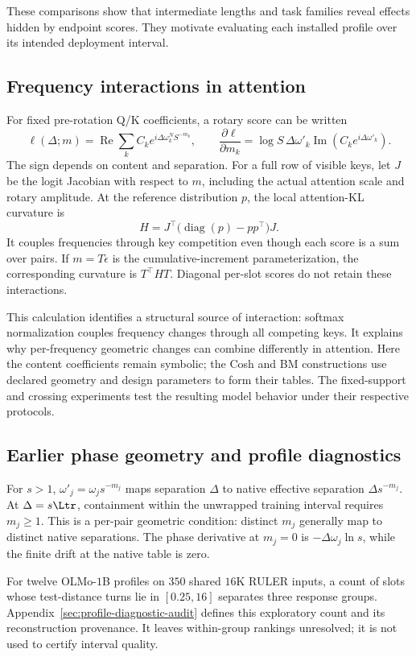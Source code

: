 These comparisons show that intermediate lengths and task families reveal effects hidden by endpoint scores. They motivate evaluating each installed profile over its intended deployment interval.

\subsection{Frequency interactions in attention}
\label{sec:interval-replay}

For fixed pre-rotation Q/K coefficients, a rotary score can be written
\[
\ell(\Delta;m)=\operatorname{Re}\sum_k C_k e^{i\Delta\omega_k^N S^{-m_k}},\qquad
\frac{\partial \ell}{\partial m_k}=\log S\,\Delta\omega'_k\operatorname{Im}(C_k e^{i\Delta\omega'_k}).
\]
The sign depends on content and separation. For a full row of visible keys, let $J$ be the logit Jacobian with respect to $m$, including the actual attention scale and rotary amplitude. At the reference distribution $p$, the local attention-KL curvature is
\[
H=J^\top\bigl(\operatorname{diag}(p)-pp^\top\bigr)J.
\]
It couples frequencies through key competition even though each score is a sum over pairs. If $m=T\epsilon$ is the cumulative-increment parameterization, the corresponding curvature is $T^\top H T$. Diagonal per-slot scores do not retain these interactions.

This calculation identifies a structural source of interaction: softmax normalization couples frequency changes through all competing keys. It explains why per-frequency geometric changes can combine differently in attention. Here the content coefficients remain symbolic; the Cosh and BM constructions use declared geometry and design parameters to form their tables. The fixed-support and crossing experiments test the resulting model behavior under their respective protocols.

\subsection{Earlier phase geometry and profile diagnostics}
\label{sec:three-band-chain}

For $s>1$, $\omega'_j=\omega_j s^{-m_j}$ maps separation $\Delta$ to native effective separation $\Delta s^{-m_j}$. At $\Delta=s\Ltr$, containment within the unwrapped training interval requires $m_j\ge1$. This is a per-pair geometric condition: distinct $m_j$ generally map to distinct native separations. The phase derivative at $m_j=0$ is $-\Delta\omega_j\ln s$, while the finite drift at the native table is zero.

For twelve OLMo-$1$B profiles on $350$ shared $16$K RULER inputs, a count of slots whose test-distance turns lie in $[0.25,16]$ separates three response groups. Appendix~\ref{sec:profile-diagnostic-audit} defines this exploratory count and its reconstruction provenance. It leaves within-group rankings unresolved; it is not used to certify interval quality.
\FloatBarrier

